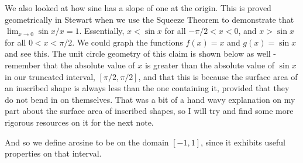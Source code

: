 \documentclass{article}
\begin{document}
\vspace{10pt}

We also looked at how sine has a slope of one at the origin. This is proved geometrically in Stewart when we use the Squeeze Theorem to demonstrate that $\lim_{x\to0}\sin x/x=1$. Essentially, $x<\sin x$ for all $-\pi/2<x<0$, and $x>\sin x$ for all $0<x<\pi/2$. We could graph the functions $f(x)=x$ and $g(x)=\sin x$ and see this. The unit circle geometry of this claim is shown below as well - remember that the absolute value of $x$ is greater than the absolute value of $\sin x$ in our truncated interval, $[\pi/2,\pi/2]$, and that this is because the surface area of an inscribed shape is always less than the one containing it, provided that they do not bend in on themselves. That was a bit of a hand wavy explanation on my part about the surface area of inscribed shapes, so I will try and find some more rigorous resources on it for the next note.

\begin{center}
\end{center}

And so we define arcsine to be on the domain $[-1,1]$, since it exhibits useful properties on that interval.

\begin{center}
\end{center}
\end{document}

